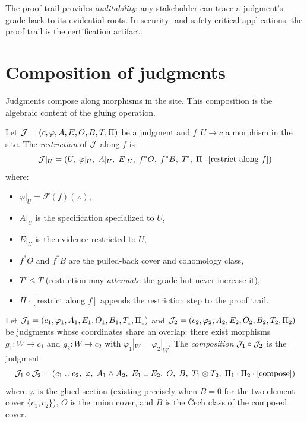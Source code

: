 The proof trail provides \emph{auditability}: any stakeholder can
trace a judgment's grade back to its evidential roots.  In security-
and safety-critical applications, the proof trail is the certification
artifact.


\section{Composition of judgments}
\label{sec:judgment:composition}

Judgments compose along morphisms in the site.  This composition is the
algebraic content of the gluing operation.

\begin{definition}
\label{def:judgment-restriction}
Let $\mathcal{J} = (c, \varphi, A, E, O, B, T, \Pi)$ be a judgment and
$f : U \to c$ a morphism in the site.  The \emph{restriction} of
$\mathcal{J}$ along $f$ is
\[
  \mathcal{J}|_U = (U,\; \varphi|_U,\; A|_U,\; E|_U,\; f^*O,\; f^*B,\;
  T',\; \Pi \cdot [\text{restrict along } f])
\]
where:
\begin{itemize}[nosep]
\item $\varphi|_U = \mathcal{F}(f)(\varphi)$,
\item $A|_U$ is the specification specialized to $U$,
\item $E|_U$ is the evidence restricted to $U$,
\item $f^*O$ and $f^*B$ are the pulled-back cover and cohomology class,
\item $T' \leq T$ (restriction may \emph{attenuate} the grade but never
  increase it),
\item $\Pi \cdot [\text{restrict along } f]$ appends the restriction
  step to the proof trail.
\end{itemize}
\end{definition}

\begin{definition}
\label{def:judgment-composition}
Let $\mathcal{J}_1 = (c_1, \varphi_1, A_1, E_1, O_1, B_1, T_1, \Pi_1)$ and
$\mathcal{J}_2 = (c_2, \varphi_2, A_2, E_2, O_2, B_2, T_2, \Pi_2)$ be
judgments whose coordinates share an overlap: there exist morphisms
$g_1 : W \to c_1$ and $g_2 : W \to c_2$ with
$\varphi_1|_W = \varphi_2|_W$.  The \emph{composition}
$\mathcal{J}_1 \circ \mathcal{J}_2$ is the judgment
\[
  \mathcal{J}_1 \circ \mathcal{J}_2 = (c_1 \cup c_2,\; \varphi,\; A_1 \wedge A_2,\;
  E_1 \sqcup E_2,\; O,\; B,\; T_1 \otimes T_2,\;
  \Pi_1 \cdot \Pi_2 \cdot [\text{compose}])
\]
where $\varphi$ is the glued section (existing precisely when $B = 0$
for the two-element cover $\{c_1, c_2\}$), $O$ is the union cover,
and $B$ is the \v{C}ech class of the composed cover.
\end{definition}

